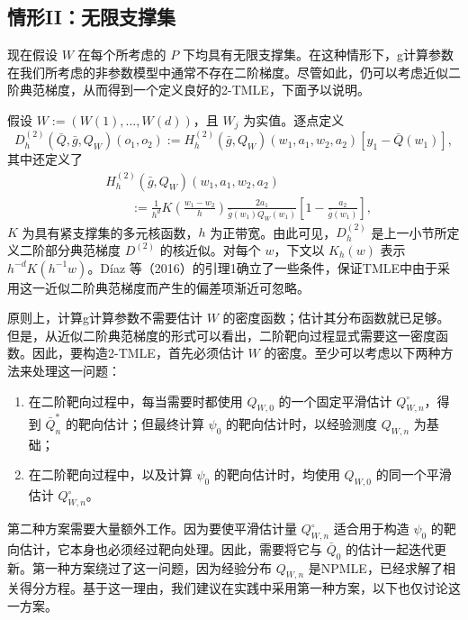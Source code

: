 \subsection{情形II：无限支撑集}

现在假设 $W$ 在每个所考虑的 $P$ 下均具有无限支撑集。在这种情形下，g计算参数在我们所考虑的非参数模型中通常不存在二阶梯度。尽管如此，仍可以考虑近似二阶典范梯度，从而得到一个定义良好的2-TMLE，下面予以说明。

假设 $W:=(W(1),\ldots,W(d))$，且 $W_j$ 为实值。逐点定义
\[
D_h^{(2)}(\bar Q,\bar g,Q_W)(o_1,o_2):=
H_h^{(2)}(\bar g,Q_W)(w_1,a_1,w_2,a_2)[y_1-\bar Q(w_1)],
\]
其中还定义了
\[
\begin{aligned}
&H_h^{(2)}(\bar g,Q_W)(w_1,a_1,w_2,a_2)\\
&\qquad:=\frac1{h^d}K\left(\frac{w_1-w_2}{h}\right)
\frac{2a_1}{\bar g(w_1)Q_W(w_1)}\left[1-\frac{a_2}{\bar g(w_1)}\right],
\end{aligned}
\]
$K$ 为具有紧支撑集的多元核函数，$h$ 为正带宽。由此可见，$D_h^{(2)}$ 是上一小节所定义二阶部分典范梯度 $D^{(2)}$ 的核近似。对每个 $w$，下文以 $K_h(w)$ 表示 $h^{-d}K(h^{-1}w)$。Díaz 等（2016）的引理1确立了一些条件，保证TMLE中由于采用这一近似二阶典范梯度而产生的偏差项渐近可忽略。

原则上，计算g计算参数不需要估计 $W$ 的密度函数；估计其分布函数就已足够。但是，从近似二阶典范梯度的形式可以看出，二阶靶向过程显式需要这一密度函数。因此，要构造2-TMLE，首先必须估计 $W$ 的密度。至少可以考虑以下两种方法来处理这一问题：
\begin{enumerate}
\item 在二阶靶向过程中，每当需要时都使用 $Q_{W,0}$ 的一个固定平滑估计 $Q_{W,n}^\circ$，得到 $\bar Q_n^*$ 的靶向估计；但最终计算 $\psi_0$ 的靶向估计时，以经验测度 $Q_{W,n}$ 为基础；
\item 在二阶靶向过程中，以及计算 $\psi_0$ 的靶向估计时，均使用 $Q_{W,0}$ 的同一个平滑估计 $Q_{W,n}^\circ$。
\end{enumerate}
第二种方案需要大量额外工作。因为要使平滑估计量 $Q_{W,n}^\circ$ 适合用于构造 $\psi_0$ 的靶向估计，它本身也必须经过靶向处理。因此，需要将它与 $\bar Q_0$ 的估计一起迭代更新。第一种方案绕过了这一问题，因为经验分布 $Q_{W,n}$ 是NPMLE，已经求解了相关得分方程。基于这一理由，我们建议在实践中采用第一种方案，以下也仅讨论这一方案。

